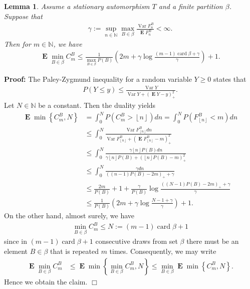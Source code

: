 \documentclass[a4paper,12pt]{article}
\newcommand{\okra}[1]{\left( #1 \right)}
\newcommand{\klam}[1]{\left\{ #1 \right\}}
\newcommand{\floor}[1]{\left\lfloor #1 \right\rfloor}
\DeclareMathOperator{\card}{card}
\DeclareMathOperator{\var}{Var}
\DeclareMathOperator{\mean}{\mathbf{E}}
\newtheorem{lemma}{Lemma}
\newenvironment*{proof}{\begin{trivlist}\item[]
\noindent\textbf{Proof:}}{$\Box$\par\end{trivlist}}
\begin{document}
\begin{lemma}
  \label{theoShortMemory}
  Assume a stationary automorphism $T$ and a finite partition $\beta$.
  Suppose that
  \begin{align}
    \gamma:=
    \sup_{n\in\mathbb{N}}\max_{B\in\beta}\frac{\var F^B_n}{\mean F^B_n}<\infty.
  \end{align}
  Then for $m\in\mathbb{N}$, we have
  \begin{align}
    \mean \min_{B\in\beta} C^B_m\le
    \frac{1}{\max_{B\in\beta} P(B)}\okra{
    2m+\gamma\log\frac{(m-1)\card\beta+\gamma}{\gamma}
    }+1
    .
  \end{align}
\end{lemma}
\begin{proof}
  The Paley-Zygmund inequality for a random variable $Y\ge 0$ states
  that
  \begin{align}
    P(Y\le y)\le\frac{\var Y}{\var Y+(\mean Y-y)_+^2}.
  \end{align}
  Let $N\in\mathbb{N}$ be a constant. Then the duality yields
  \begin{align}
    \mean \min\klam{C^B_m,N}
    &=
    \int_0^{N} P(C^B_m>\floor{n}) dn
    =
      \int_0^{N} P(F^B_{\floor{n}}<m) dn
      \nonumber\\
    &\le \int_0^{N} \frac{\var F^B_{\floor{n}}
      dn}{\var F^B_{\floor{n}}+(\mean F^B_{\floor{n}}-m)_+^2}
      \nonumber\\
    & \le \int_0^{N} \frac{\gamma \floor{n}P(B)
      dn}{\gamma \floor{n}P(B)+(\floor{n}P(B)-m)_+^2}
      \nonumber\\
    &\le \int_0^{N}
      \frac{\gamma dn}{((n-1)P(B)-2m)_++\gamma}
      \nonumber\\
    &\le \frac{2m}{P(B)}+1+
      \frac{\gamma}{P(B)}\log\frac{((N-1)P(B)-2m)_++\gamma}{\gamma}
      \nonumber\\
    &\le \frac{1}{P(B)}\okra{2m+
      \gamma\log\frac{N-1+\gamma}{\gamma}}+1
      .
  \end{align}
  On the other hand, almost surely, we have
  \begin{align}
    \min_{B\in\beta} C^B_m\le N:=(m-1)\card\beta+1
  \end{align}
  since in $(m-1)\card\beta+1$ consecutive draws from set $\beta$
  there must be an element $B\in\beta$ that is repeated $m$ times.
  Consequently, we may write
  \begin{align}
    \mean \min_{B\in\beta} C^B_m
    &\le \mean \min\klam{\min_{B\in\beta} C^B_m,N}
      \le \min_{B\in\beta} \mean \min\klam{C^B_m, N}
      .
  \end{align}
  Hence we obtain the claim.
\end{proof}
\end{document}
